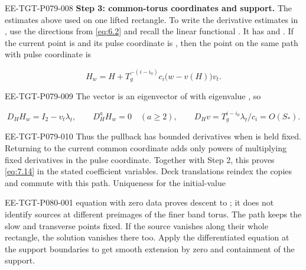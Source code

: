 \begin{EESegment}{EE-TGT-P079-008}
\textbf{Step 3: common-torus coordinates and support.}
The estimates above used  on one lifted rectangle. To write the derivative estimates in , use the directions  from \eqref{eq:6.2} and recall the linear functional . It has  and . If the current point is  and its pulse coordinate is , then the point on the same path with pulse coordinate  is
\end{EESegment}
\[
  H_w=H+T_g^{-(i-i_0)}c_i\bigl(w-v(H)\bigr)v_t.
\]
\begin{EESegment}{EE-TGT-P079-009}
The vector  is an eigenvector of  with eigenvalue , so
\end{EESegment}
\[
  D_HH_w=I_2-v_t\lambda_t,\qquad
  D_H^aH_w=0\quad(a\geq2),\qquad
  D_Hv=T_g^{i-i_0}\lambda_t/c_i=O(S_*).
\]
\begin{EESegment}{EE-TGT-P079-010}
Thus the pullback  has bounded derivatives when  is held fixed. Returning to the current common coordinate adds only powers of  multiplying fixed derivatives in the pulse coordinate. Together with Step 2, this proves \eqref{eq:7.14} in the stated coefficient variables. Deck translations reindex the copies and commute with this path. Uniqueness for the initial-value
\end{EESegment}
%
\begin{EESegment}{EE-TGT-P080-001}
equation with zero data proves descent to ; it does not identify sources at different preimages of the finer band torus. The path keeps the slow and transverse points fixed. If the source vanishes along their whole rectangle, the solution vanishes there too. Apply the differentiated equation at the support boundaries to get smooth extension by zero and containment of the support.
\end{EESegment}

